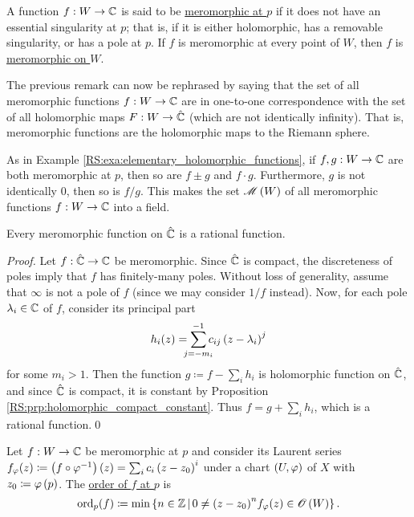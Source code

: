 \documentclass[../Moduli_Spaces_of_Riemann_Surfaces.tex]{subfiles}
\begin{document}
    \begin{definition}
        A function $f:W\to\mathbb{C}$ is said to be \ul{meromorphic at $p$} if it does not have an essential singularity at $p$; that is, if it is either holomorphic, has a removable singularity, or has a pole at $p$. If $f$ is meromorphic at every point of $W$, then $f$ is \ul{meromorphic on $W$}.
    \end{definition}
    \begin{remark}
        The previous remark can now be rephrased by saying that the set of all meromorphic functions $f:W\to\mathbb{C}$ are in one-to-one correspondence with the set of all holomorphic maps $F:W\to\hat{\mathbb{C}}$ (which are not identically infinity). That is, meromorphic functions are the holomorphic maps to the Riemann sphere.\exqed
    \end{remark}
    \begin{example}
        As in Example \ref{RS:exa:elementary_holomorphic_functions}, if $f,g:W\to\mathbb{C}$ are both meromorphic at $p$, then so are $f\pm g$ and $f\cdot g$. Furthermore, $g$ is not identically $0$, then so is $f/g$. This makes the set $\mathscr{M}\left(W\right)$ of all meromorphic functions $f:W\to\mathbb{C}$ into a field.\exqed
    \end{example}
    \begin{proposition}\label{RS:prp:meromorphic_Riemann_sphere_rational}
        Every meromorphic function on $\hat{\mathbb{C}}$ is a rational function.
    \end{proposition}
    \begin{proof}
        Let $f:\hat{\mathbb{C}}\to\mathbb{C}$ be meromorphic. Since $\hat{\mathbb{C}}$ is compact, the discreteness of poles imply that $f$ has finitely-many poles. Without loss of generality, assume that $\infty$ is not a pole of $f$ (since we may consider $1/f$ instead). Now, for each pole $\lambda_i\in\mathbb{C}$ of $f$, consider its principal part
        \begin{equation*}
            h_i\!\l(z\r)=\sum_{\mathclap{j=-m_i}}^{-1}c_{ij}\l(z-\lambda_i\r)^j
        \end{equation*}
        for some $m_i>1$. Then the function $g\coloneqq f-\sum_ih_i$ is holomorphic function on $\hat{\mathbb{C}}$, and since $\hat{\mathbb{C}}$ is compact, it is constant by Proposition \ref{RS:prp:holomorphic_compact_constant}. Thus $f=g+\sum_ih_i$, which is a rational function.\qed
    \end{proof}
    \begin{definition}\label{RS:def:order}
        Let $f:W\to\mathbb{C}$ be meromorphic at $p$ and consider its Laurent series $f_\varphi\!\left(z\right)\coloneqq\left(f\circ\varphi^{-1}\right)\left(z\right)=\sum_{i}c_i\left(z-z_0\right)^i$ under a chart $\left(U,\varphi\right)$ of $X$ with $z_0\coloneqq\varphi\left(p\right)$. The \ul{order of $f$ at $p$} is
        \begin{equation*}
            \operatorname{ord}_p\!\left(f\right)\coloneqq\operatorname{min}\left\{n\in\mathbb{Z}\,\middle\vert\,0\neq\left(z-z_0\right)^n\!f_\varphi\!\left(z\right)\in\mathscr{O}\left(W\right)\right\}.
        \end{equation*}
    \end{definition}
\end{document}

